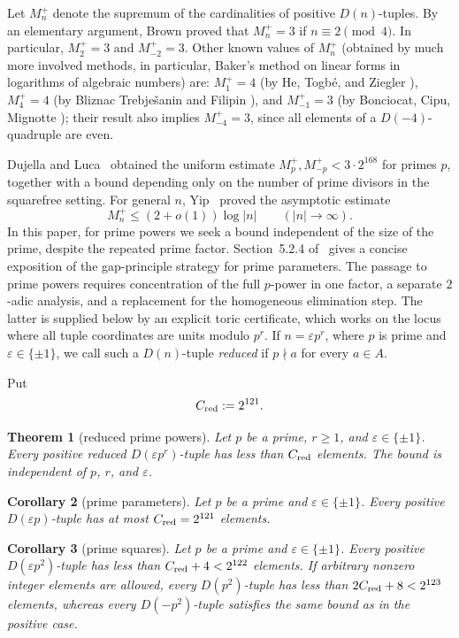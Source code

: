 \documentclass[11pt]{amsart}
\newtheorem{theorem}{Theorem}[section]
\newtheorem{corollary}[theorem]{Corollary}
\theoremstyle{remark}
\newcommand{\eps}{\varepsilon}
\begin{document}
Let $M_n^+$ denote the
supremum of the cardinalities of positive $D(n)$-tuples. 
By an elementary argument, Brown \cite{Brown} proved that 
$M_n^+=3$ if $n\equiv 2\pmod{4}$. In particular, $M_2^+=3$ and $M_{-2}^+=3$. Other known values of $M_n^+$ 
(obtained by much more involved methods, in particular, Baker's method on linear forms in 
logarithms of algebraic numbers) are: 
$M_1^+=4$ (by He, Togb\'e, and Ziegler \cite{HTZ}), 
$M_4^+=4$ (by Bliznac Trebje\v{s}anin and Filipin \cite{BTF}), 
and $M_{-1}^+=3$ (by Bonciocat, Cipu, Mignotte \cite{BCM}); 
their result also implies $M_{-4}^+=3$, since all elements of a $D(-4)$-quadruple are even. 

Dujella and Luca~\cite{DL} obtained the uniform estimate
$M_p^+,M_{-p}^+<3\cdot2^{168}$ for primes $p$, together with a bound
depending only on the number of prime divisors in the squarefree setting.
For general $n$, Yip~\cite{Yip} proved the asymptotic estimate
\[
 M_n^+\le (2+o(1))\log |n|\qquad (|n|\to\infty).
\]
In this paper, for prime powers we seek a bound independent of
the size of the prime, despite the repeated prime factor. Section~5.2.4
of~\cite{Dbook} gives a concise exposition of the gap-principle strategy for
prime parameters. The passage to prime powers requires concentration of the
full $p$-power in one factor, a separate $2$-adic analysis, and a replacement
for the homogeneous elimination step. The latter is supplied below by an
explicit toric certificate, which works on the locus where all tuple
coordinates are units modulo $p^r$. 
If
$n=\eps p^r$, where $p$ is prime and $\eps\in\{\pm1\}$, we call such a
$D(n)$-tuple \emph{reduced} if $p\nmid a$ for every $a\in A$.

Put
\[
 C_{\rm red}:=2^{121}.
\]

\begin{theorem}[reduced prime powers]\label{thm:reduced}
Let $p$ be a prime, $r\ge1$, and $\eps\in\{\pm1\}$. Every positive reduced
$D(\eps p^r)$-tuple has less than $C_{\rm red}$ elements. The bound is
independent of $p$, $r$, and $\eps$.
\end{theorem}

\begin{corollary}[prime parameters]\label{cor:prime}
Let $p$ be a prime and $\eps\in\{\pm1\}$. Every positive $D(\eps p)$-tuple
has at most $C_{\rm red}=2^{121}$ elements.
\end{corollary}

\begin{corollary}[prime squares]\label{cor:p2}
Let $p$ be a prime and $\eps\in\{\pm1\}$. Every positive
$D(\eps p^2)$-tuple has less than $C_{\rm red}+4<2^{122}$ elements. If
arbitrary nonzero integer elements are allowed, every $D(p^2)$-tuple has
less than $2C_{\rm red}+8<2^{123}$ elements, whereas every
$D(-p^2)$-tuple satisfies the same bound as in the positive case.
\end{corollary}
\end{document}
